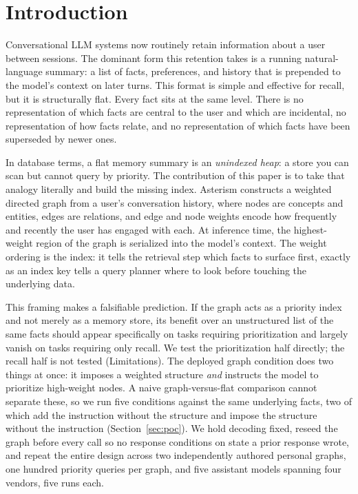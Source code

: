\documentclass[11pt]{article}
\begin{document}
\begin{abstract}
contradicted facts. Retrieval latency scales approximately linearly, near 34\,ms at 10{,}000 nodes. We release the full system, both benchmark graphs, and all negative results.
\end{abstract}

\section{Introduction}

Conversational LLM systems now routinely retain information about a user between sessions. The dominant form this retention takes is a running natural-language summary: a list of facts, preferences, and history that is prepended to the model's context on later turns. This format is simple and effective for recall, but it is structurally flat. Every fact sits at the same level. There is no representation of which facts are central to the user and which are incidental, no representation of how facts relate, and no representation of which facts have been superseded by newer ones.

In database terms, a flat memory summary is an \emph{unindexed heap}: a store you can scan but cannot query by priority. The contribution of this paper is to take that analogy literally and build the missing index. Asterism constructs a weighted directed graph from a user's conversation history, where nodes are concepts and entities, edges are relations, and edge and node weights encode how frequently and recently the user has engaged with each. At inference time, the highest-weight region of the graph is serialized into the model's context. The weight ordering is the index: it tells the retrieval step which facts to surface first, exactly as an index key tells a query planner where to look before touching the underlying data.

This framing makes a falsifiable prediction. If the graph acts as a priority index and not merely as a memory store, its benefit over an unstructured list of the same facts should appear specifically on tasks requiring prioritization and largely vanish on tasks requiring only recall. We test the prioritization half directly; the recall half is not tested (Limitations). The deployed graph condition does two things at once: it imposes a weighted structure \emph{and} instructs the model to prioritize high-weight nodes. A naive graph-versus-flat comparison cannot separate these, so we run five conditions against the same underlying facts, two of which add the instruction without the structure and impose the structure without the instruction (Section~\ref{sec:poc}). We hold decoding fixed, reseed the graph before every call so no response conditions on state a prior response wrote, and repeat the entire design across two independently authored personal graphs, one hundred priority queries per graph, and five assistant models spanning four vendors, five runs each.
\end{document}

